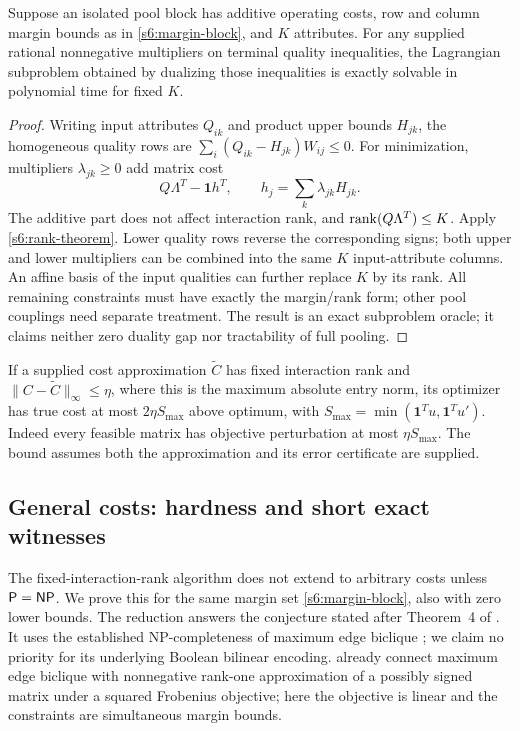 \begin{corollary}\label{s6:oracle}
Suppose an isolated pool block has additive operating costs, row and
column margin bounds as in \eqref{s6:margin-block}, and $K$ attributes.
For any supplied rational nonnegative multipliers on terminal quality
inequalities, the Lagrangian subproblem obtained by dualizing those
inequalities is exactly solvable in polynomial time for fixed $K$.
\end{corollary}
\begin{proof}
Writing input attributes $Q_{ik}$ and product upper bounds $H_{jk}$,
the homogeneous quality rows are
$\sum_i(Q_{ik}-H_{jk})W_{ij}\le0$.
For minimization, multipliers $\lambda_{jk}\ge0$ add matrix cost
\[
 Q\Lambda^T-\mathbf1 h^T,\qquad h_j=\sum_k\lambda_{jk}H_{jk}.
\]
The additive part does not affect interaction rank, and
$\operatorname{rank}(Q\Lambda^T)\le K$. Apply \cref{s6:rank-theorem}.
Lower quality rows reverse the corresponding signs; both upper and lower
multipliers can be combined into the same $K$ input-attribute columns.
An affine basis of the input qualities can further replace $K$ by its
rank. All remaining constraints must have exactly the margin/rank form;
other pool couplings need separate treatment. The result is an exact
subproblem oracle; it claims neither zero duality gap nor tractability
of full pooling.
\end{proof}
If a supplied cost approximation $\widetilde C$ has fixed interaction
rank and $\|C-\widetilde C\|_\infty\le\eta$, where this is the maximum
absolute entry norm, its optimizer has true cost at most
$2\eta S_{\max}$ above optimum, with
$S_{\max}=\min(\mathbf1^Tu,\mathbf1^Tu')$. Indeed every feasible
matrix has objective perturbation at most $\eta S_{\max}$. The bound
assumes both the approximation and its error certificate are supplied.


\subsection{General costs: hardness and short exact witnesses}

The fixed-interaction-rank algorithm does not extend to arbitrary costs
unless $\mathsf P=\mathsf{NP}$. We prove this for the same margin set
\eqref{s6:margin-block}, also with zero lower bounds.
The reduction answers the conjecture stated after Theorem~4 of
\citet{dey2020-convexifications-of-rank-one-based}. It uses the
established NP-completeness of maximum edge biclique
\cite{app:peeters2003}; we claim no priority for its underlying
Boolean bilinear encoding. \citet{app:gillis2014} already connect
maximum edge biclique with nonnegative rank-one approximation of a
possibly signed matrix under a squared Frobenius objective; here the
objective is linear and the constraints are simultaneous margin bounds.

